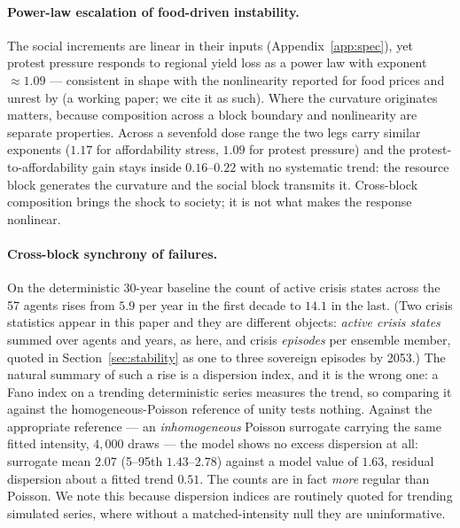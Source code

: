 \documentclass[12pt,a4paper]{article}
\newcommand{\crisisFirst}{5.9} \newcommand{\crisisLast}{14.1}
\begin{document}
\paragraph{Power-law escalation of food-driven instability.} The social increments are linear
in their inputs (Appendix~\ref{app:spec}), yet protest pressure responds to regional yield loss
as a power law with exponent ${\approx}1.09$ --- consistent in shape with the nonlinearity
reported for food prices and unrest by \citet{lagi2011food} (a working paper; we cite it as
such). Where the curvature originates matters, because composition across a block boundary and
nonlinearity are separate properties. Across a sevenfold dose range the two legs carry similar
exponents ($1.17$ for affordability stress, $1.09$ for protest pressure) and the
protest-to-affordability gain stays inside $0.16$--$0.22$ with no systematic trend: the
resource block generates the curvature and the social block transmits it. Cross-block
composition brings the shock to society; it is not what makes the response nonlinear.

\paragraph{Cross-block synchrony of failures.} On the deterministic 30-year baseline the count
of active crisis states across the 57 agents rises from $\crisisFirst$ per year in the first
decade to $\crisisLast$ in the last. (Two crisis statistics appear in this paper and they are
different objects: \emph{active crisis states} summed over agents and years, as here, and
crisis \emph{episodes} per ensemble member, quoted in Section~\ref{sec:stability} as one to
three sovereign episodes by 2053.) The natural summary of such a rise is a dispersion index,
and it is the wrong one: a Fano index on a trending deterministic series measures the trend, so
comparing it against the homogeneous-Poisson reference of unity tests nothing. Against the
appropriate reference --- an \emph{inhomogeneous} Poisson surrogate carrying the same fitted
intensity, $4{,}000$ draws --- the model shows no excess dispersion at all: surrogate mean
$2.07$ (5--95th $1.43$--$2.78$) against a model value of $1.63$, residual dispersion about a
fitted trend $0.51$. The counts are in fact \emph{more} regular than Poisson. We note this
because dispersion indices are routinely quoted for trending simulated series, where without a
matched-intensity null they are uninformative.
\end{document}
